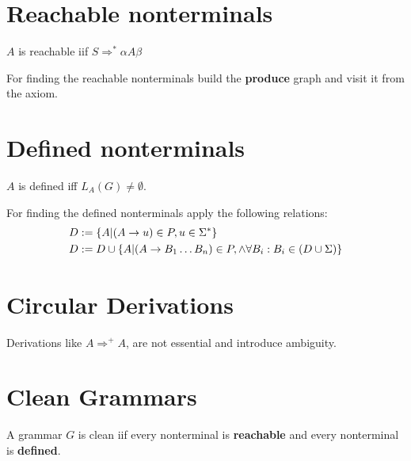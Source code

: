\section{Reachable nonterminals}

$A$ is reachable iif $S \Rightarrow^* \alpha A \beta$

For finding the reachable nonterminals build the \textbf{produce} graph and visit it from the axiom.

\section{Defined nonterminals}
$A$ is defined iff $L_A(G) \ne \emptyset$.

For finding the defined nonterminals apply the following relations:
\begin{align*}
    D &:= \{ A | (A \rightarrow u) \in P, u \in \Sigma^*\} \\
    D &:= D \cup \{ A | (A \rightarrow B_1\ldots B_n) \in P, \land \forall B_i: B_i \in (D \cup \Sigma) \}
\end{align*}

\section{Circular Derivations}

Derivations like $A \Rightarrow^+ A$, are not essential and introduce ambiguity.

\section{Clean Grammars}
A grammar $G$ is clean iif every nonterminal is \textbf{reachable} and every nonterminal is \textbf{defined}.
